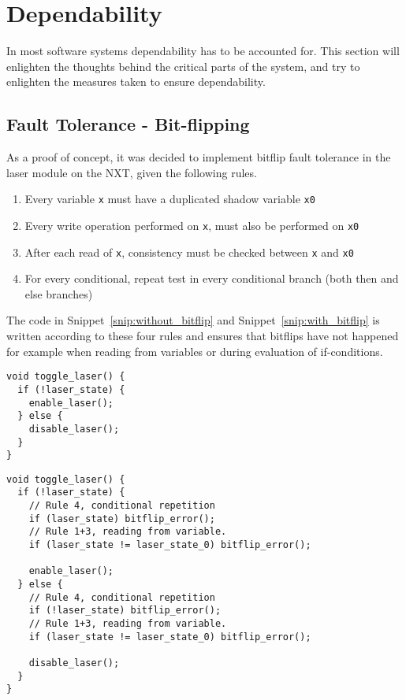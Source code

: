\section{Dependability}\label{Design:Dependability}
In most software systems dependability has to be accounted for.
This section will enlighten the thoughts behind the critical parts of the system, and try to enlighten the measures taken to ensure dependability.

\subsection{Fault Tolerance - Bit-flipping}
As a proof of concept, it was decided to implement bitflip fault tolerance in the laser module on the NXT, given the following rules.

\begin{enumerate}
  \item Every variable \texttt{x} must have a duplicated shadow variable \texttt{x0} \cite{errorDetectionSoft}
  \item Every write operation performed on \texttt{x}, must also be performed on \texttt{x0} \cite{errorDetectionSoft}
  \item After each read of \texttt{x}, consistency must be checked between \texttt{x} and \texttt{x0} \cite{errorDetectionSoft}
  \item For every conditional, repeat test in every conditional branch (both then and else branches) \cite{errorDetectionSoft}
\end{enumerate}

The code in Snippet~\ref{snip:without_bitflip} and Snippet~\ref{snip:with_bitflip} is written according to these four rules and ensures that bitflips have not happened for example when reading from variables or during evaluation of if-conditions.

\noindent\begin{minipage}{.45\textwidth}
\begin{lstlisting}[label={snip:without_bitflip},caption={Without~bitflip-security},frame=tlrb,numbers=none]
void toggle_laser() {
  if (!laser_state) {
    enable_laser();
  } else {
    disable_laser();
  }
}
\end{lstlisting}
\end{minipage}\hfill
\begin{minipage}{.45\textwidth}
\begin{lstlisting}[label={snip:with_bitflip},caption={With bitflip-security},frame=tlrb,numbers=none]
void toggle_laser() {
  if (!laser_state) {
    // Rule 4, conditional repetition
    if (laser_state) bitflip_error();
    // Rule 1+3, reading from variable.
    if (laser_state != laser_state_0) bitflip_error();

    enable_laser();
  } else {
    // Rule 4, conditional repetition
    if (!laser_state) bitflip_error();
    // Rule 1+3, reading from variable.
    if (laser_state != laser_state_0) bitflip_error();

    disable_laser();
  }
}
\end{lstlisting}
\end{minipage}

